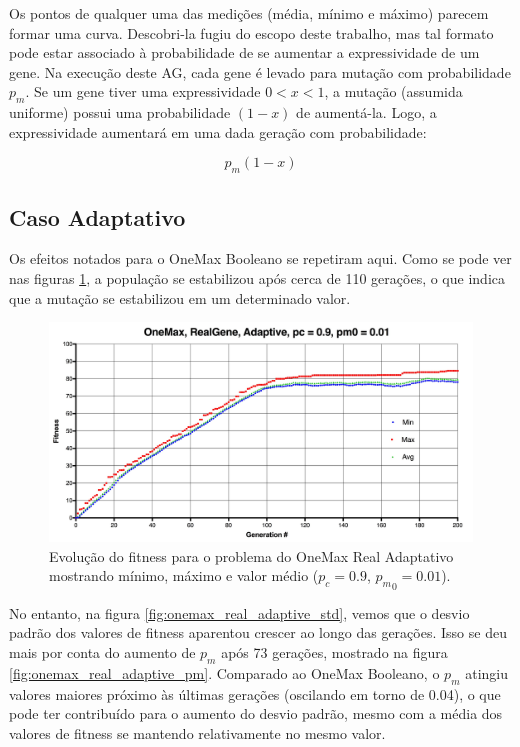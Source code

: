 Os pontos de qualquer uma das medições (média, mínimo e máximo) parecem formar uma curva. Descobri-la fugiu do escopo deste trabalho, mas tal formato pode estar associado à probabilidade de se aumentar a expressividade de um gene. Na execução deste AG, cada gene é levado para mutação com probabilidade $p_m$. Se um gene tiver uma expressividade $0 < x < 1$, a mutação (assumida uniforme) possui uma probabilidade $(1-x)$ de aumentá-la. Logo, a expressividade aumentará em uma dada geração com probabilidade:

\begin{equation}
	p_m(1-x)
\end{equation}

\subsection{Caso Adaptativo}

Os efeitos notados para o OneMax Booleano se repetiram aqui. Como se pode ver nas figuras \ref{fig:onemax_real_adaptive}, a população se estabilizou após cerca de 110 gerações, o que indica que a mutação se estabilizou em um determinado valor.

\begin{figure}[ht!]
    \centering \includegraphics[width=1.0\textwidth]{onemax_real_adaptive.jpg}
    \caption{Evolução do fitness para o problema do OneMax Real Adaptativo mostrando mínimo, máximo e valor médio ($p_c=0.9$, ${p_m}_0=0.01$).}
    \label{fig:onemax_real_adaptive}
\end{figure}

No entanto, na figura \ref{fig:onemax_real_adaptive_std}, vemos que o desvio padrão dos valores de fitness aparentou crescer ao longo das gerações. Isso se deu mais por conta do aumento de $p_m$ após 73 gerações, mostrado na figura \ref{fig:onemax_real_adaptive_pm}. Comparado ao OneMax Booleano, o $p_m$ atingiu valores maiores próximo às últimas gerações (oscilando em torno de 0.04), o que pode ter contribuído para o aumento do desvio padrão, mesmo com a média dos valores de fitness se mantendo relativamente no mesmo valor.


